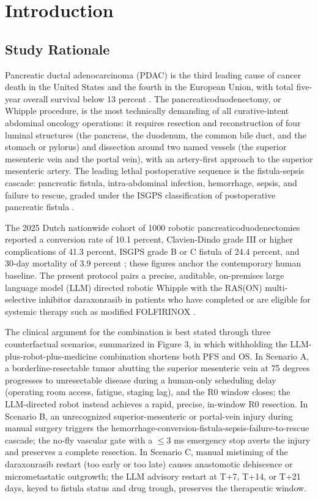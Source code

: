 \section{Introduction}

\subsection{Study Rationale}

Pancreatic ductal adenocarcinoma (PDAC) is the third leading cause of cancer
death in the United States and the fourth in the European Union, with total
five-year overall survival below 13 percent \cite{Siegel2025}. The
pancreaticoduodenectomy, or Whipple procedure, is the most technically demanding
of all curative-intent abdominal oncology operations: it requires resection and
reconstruction of four luminal structures (the pancreas, the duodenum, the common
bile duct, and the stomach or pylorus) and dissection around two named vessels
(the superior mesenteric vein and the portal vein), with an artery-first approach
to the superior mesenteric artery. The leading lethal postoperative sequence is
the fistula-sepsis cascade: pancreatic fistula, intra-abdominal infection,
hemorrhage, sepsis, and failure to rescue, graded under the ISGPS classification
of postoperative pancreatic fistula \cite{Bassi2017}. 

The 2025 Dutch nationwide
cohort of 1000 robotic pancreaticoduodenectomies reported a conversion rate of
10.1 percent, Clavien-Dindo grade III or higher complications of 41.3 percent,
ISGPS grade B or C fistula of 24.4 percent, and 30-day mortality of 3.9 percent
\cite{DutchCohort2025}; these figures anchor the contemporary human baseline. The
present protocol pairs a precise, auditable, on-premises large language model
(LLM) directed robotic Whipple with the RAS(ON) multi-selective inhibitor
daraxonrasib in patients who have completed or are eligible for systemic therapy
such as modified FOLFIRINOX \cite{Conroy2018}.

The clinical argument for the combination is best stated through three
counterfactual scenarios, summarized in Figure 3, in which withholding the
LLM-plus-robot-plus-medicine combination shortens both PFS and OS. In Scenario A,
a borderline-resectable tumor abutting the superior mesenteric vein at 75 degrees
progresses to unresectable disease during a human-only scheduling delay (operating
room access, fatigue, staging lag), and the R0 window closes; the LLM-directed
robot instead achieves a rapid, precise, in-window R0 resection. In Scenario B, an
unrecognized superior-mesenteric or portal-vein injury during manual surgery
triggers the hemorrhage-conversion-fistula-sepsis-failure-to-rescue cascade; the
no-fly vascular gate with a $\leq 3$ ms emergency stop averts the injury and
preserves a complete resection. In Scenario C, manual mistiming of the
daraxonrasib restart (too early or too late) causes anastomotic dehiscence or
micrometastatic outgrowth; the LLM advisory restart at T+7, T+14, or T+21 days,
keyed to fistula status and drug trough, preserves the therapeutic window.

